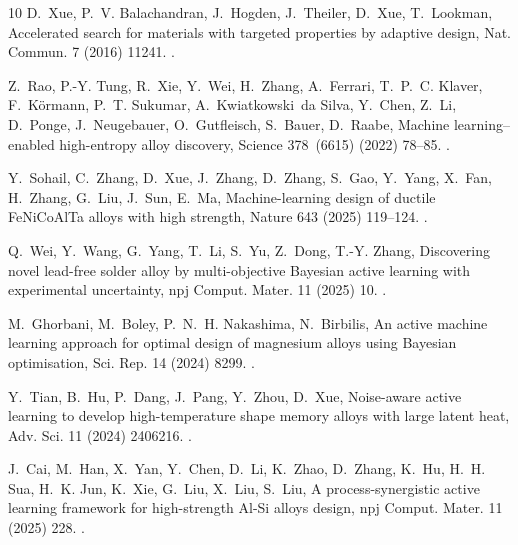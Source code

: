 \documentclass[preprint,12pt,times]{elsarticle}  %
\providecommand{\JournalTitle}[1]{#1}
\begin{document}
\begin{thebibliography}{10}
D.~Xue, P.~V. Balachandran, J.~Hogden, J.~Theiler, D.~Xue, T.~Lookman,
  Accelerated search for materials with targeted properties by adaptive design,
  {\JournalTitle{Nat. Commun.}} 7 (2016) 11241.
\newblock \href {http://dx.doi.org/10.1038/ncomms11241}
  {}.

Z.~Rao, P.-Y. Tung, R.~Xie, Y.~Wei, H.~Zhang, A.~Ferrari, T.~P.~C. Klaver,
  F.~K{\"o}rmann, P.~T. Sukumar, A.~Kwiatkowski~da Silva, Y.~Chen, Z.~Li,
  D.~Ponge, J.~Neugebauer, O.~Gutfleisch, S.~Bauer, D.~Raabe, Machine
  learning--enabled high-entropy alloy discovery, {\JournalTitle{Science}}
  378~(6615) (2022) 78--85.
\newblock \href {http://dx.doi.org/10.1126/science.abo4940}
  {}.

Y.~Sohail, C.~Zhang, D.~Xue, J.~Zhang, D.~Zhang, S.~Gao, Y.~Yang, X.~Fan,
  H.~Zhang, G.~Liu, J.~Sun, E.~Ma, Machine-learning design of ductile
  {FeNiCoAlTa} alloys with high strength, {\JournalTitle{Nature}} 643 (2025)
  119--124.
\newblock \href {http://dx.doi.org/10.1038/s41586-025-09160-2}
  {}.

Q.~Wei, Y.~Wang, G.~Yang, T.~Li, S.~Yu, Z.~Dong, T.-Y. Zhang, Discovering novel
  lead-free solder alloy by multi-objective {Bayesian} active learning with
  experimental uncertainty, {\JournalTitle{npj Comput. Mater.}} 11
  (2025) 10.
\newblock \href {http://dx.doi.org/10.1038/s41524-024-01480-7}
  {}.

M.~Ghorbani, M.~Boley, P.~N.~H. Nakashima, N.~Birbilis, An active machine
  learning approach for optimal design of magnesium alloys using {Bayesian}
  optimisation, {\JournalTitle{Sci. Rep.}} 14 (2024) 8299.
\newblock \href {http://dx.doi.org/10.1038/s41598-024-59100-9}
  {}.

Y.~Tian, B.~Hu, P.~Dang, J.~Pang, Y.~Zhou, D.~Xue, Noise-aware active learning
  to develop high-temperature shape memory alloys with large latent heat,
  {\JournalTitle{Adv. Sci.}} 11 (2024) 2406216.
\newblock \href {http://dx.doi.org/10.1002/advs.202406216}
  {}.

J.~Cai, M.~Han, X.~Yan, Y.~Chen, D.~Li, K.~Zhao, D.~Zhang, K.~Hu, H.~H. Sua,
  H.~K. Jun, K.~Xie, G.~Liu, X.~Liu, S.~Liu, A process-synergistic active
  learning framework for high-strength {Al-Si} alloys design,
  {\JournalTitle{npj Comput. Mater.}} 11 (2025) 228.
\newblock \href {http://dx.doi.org/10.1038/s41524-025-01721-3}
  {}.


\end{thebibliography}
\end{document}
